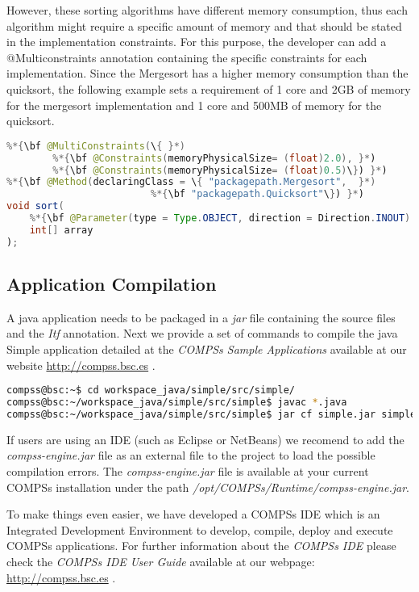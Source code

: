 However, these sorting algorithms have different memory consumption, thus each algorithm might require a
specific amount of memory and that should be stated in the implementation constraints. For this purpose, the
developer can add a @Multiconstraints annotation containing the specific constraints for each
implementation. Since the Mergesort has a higher memory consumption than the quicksort, the following
example sets a requirement of 1 core and 2GB of memory for the mergesort implementation and 1 core and
500MB of memory for the quicksort.

\begin{lstlisting}[language=java]
%*{\bf @Constraints(processorCoreCount = 1) }*)
%*{\bf @MultiConstraints(\{ }*)
        %*{\bf @Constraints(memoryPhysicalSize= (float)2.0), }*)
        %*{\bf @Constraints(memoryPhysicalSize= (float)0.5)\}) }*)
%*{\bf @Method(declaringClass = \{ "packagepath.Mergesort",  }*)
                         %*{\bf "packagepath.Quicksort"\}) }*)
void sort(
    %*{\bf @Parameter(type = Type.OBJECT, direction = Direction.INOUT) }*)
    int[] array
);
\end{lstlisting}

\subsection{Application Compilation}
A java application needs to be packaged in a \textit{jar} file containing the source files and the \textit{Itf} annotation.
Next we provide a set of commands to compile the java Simple application detailed at the \textit{COMPSs Sample Applications} 
available at our website \url{http://compss.bsc.es} .
\begin{lstlisting}[language=bash]
compss@bsc:~$ cd workspace_java/simple/src/simple/
compss@bsc:~/workspace_java/simple/src/simple$ javac *.java
compss@bsc:~/workspace_java/simple/src/simple$ jar cf simple.jar simple 
\end{lstlisting}

If users are using an IDE (such as Eclipse or NetBeans) we recomend to add the \textit{compss-engine.jar} file as an external file 
to the project to load the possible compilation errors. The \textit{compss-engine.jar} file is available at your current 
COMPSs installation under the path \textit{/opt/COMPSs/Runtime/compss-engine.jar}.

To make things even easier, we have developed a COMPSs IDE which is an Integrated Development Environment to develop, compile,
deploy and execute COMPSs applications. For further information about the \textit{COMPSs IDE} please check the \textit{COMPSs IDE
User Guide} available at our webpage: \url{http://compss.bsc.es} .

